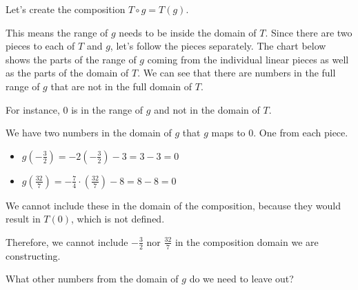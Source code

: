 \documentclass{ximera}
\begin{document}
Let's create the composition $T \circ g = T(g)$.


This means the range of $g$ needs to be inside the domain of $T$. Since there are two pieces to each of $T$ and $g$, let's follow the pieces separately.  The chart below shows the parts of the range of $g$ coming from the individual linear pieces as well as the parts of the domain of $T$. We can see that there are numbers in the full range of $g$ that are not in the full domain of $T$.

For instance, $0$ is in the range of $g$ and not in the domain of $T$. 

We have two numbers in the domain of $g$ that $g$ maps to $0$. One from each piece.


\begin{itemize}
  \item $g\left( -\frac{3}{2} \right) = -2 \left( -\frac{3}{2} \right) - 3 = 3 - 3 = 0$
  \item $g\left( \frac{32}{7} \right) = -\frac{7}{4} \cdot \left( \frac{32}{7} \right) - 8 = 8 - 8 = 0$
\end{itemize}

We cannot include these in the domain of the composition, because they would result in $T(0)$, which is not defined.

Therefore, we cannot include $-\frac{3}{2}$ nor $\frac{32}{7}$ in the composition domain we are constructing.  

What other numbers from the domain of $g$ do we need to leave out?
\end{document}
